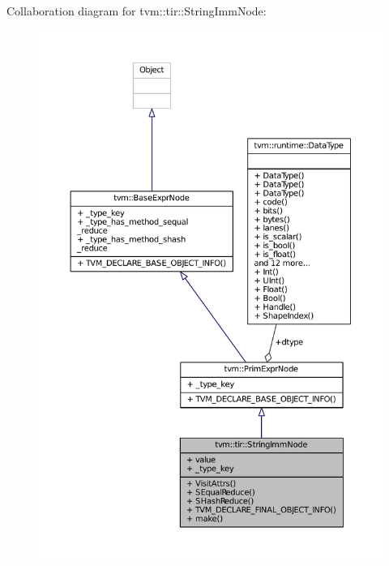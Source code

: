 Collaboration diagram for tvm\+:\+:tir\+:\+:String\+Imm\+Node\+:
\nopagebreak
\begin{figure}[H]
\begin{center}
\leavevmode
\includegraphics[width=350pt]{classtvm_1_1tir_1_1StringImmNode__coll__graph}
\end{center}
\end{figure}
